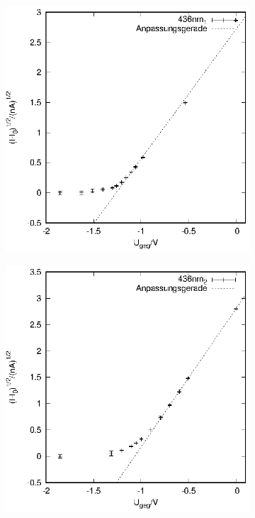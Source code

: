 \begin{figure}
\begin{subfigure}[h]{0.49\textwidth}
  \end{subfigure}
  \begin{subfigure}[h]{0.49\textwidth}
    \centering
    \includegraphics{data/Messung_photoeffekt/436nm_1.eps}
  \end{subfigure}
  \begin{subfigure}[h]{0.49\textwidth}
    \centering
    \includegraphics{data/Messung_photoeffekt/436nm_2.eps}
  \end{subfigure}
\end{figure}
